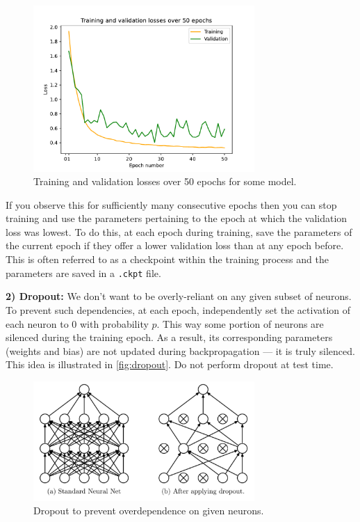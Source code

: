 \documentclass[11pt]{article}
\begin{document}
\begin{figure}
    \centering
    \includegraphics[width=0.75\textwidth]{./figures/neural_nets/REG_early_stopping.pdf}
    \caption{Training and validation losses over 50 epochs for some model.}
    \label{fig:early_stopping}
\end{figure}

If you observe this for sufficiently many consecutive epochs then you can stop training and use the parameters pertaining to the epoch at which the validation loss was lowest. To do this, at each epoch during training, save the parameters of the current epoch if they offer a lower validation loss than at any epoch before. This is often referred to as a checkpoint within the training process and the parameters are saved in a \texttt{.ckpt} file.

\vspace{10pt}
\noindent\textbf{2) Dropout:} We don't want to be overly-reliant on any given subset of neurons. To prevent such dependencies, at each epoch, independently set the activation of each neuron to 0 with probability $p$. This way some portion of neurons are silenced during the training epoch. As a result, its corresponding parameters (weights and bias) are not updated during backpropagation — it is truly silenced. This idea is illustrated in \autoref{fig:dropout}. Do not perform dropout at test time.

\begin{figure}[ht]
    \centering
    \includegraphics[width=0.75\textwidth]{./figures/neural_nets/REG_dropout.png}
    \caption{Dropout to prevent overdependence on given neurons.}
    \label{fig:dropout}
\end{figure}
\end{document}
